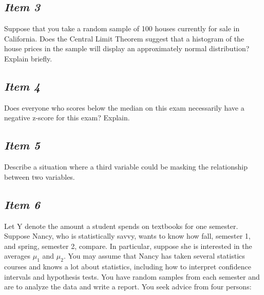 \subsection{\textbf{\textit{Item 3}}}
Suppose that you take a random sample of 100 houses currently for sale in California.  Does the Central Limit Theorem suggest that a histogram of the house prices in the sample will display an approximately normal distribution?  Explain briefly.

\subsection{\textbf{\textit{Item 4}}}
Does everyone who scores below the median on this exam necessarily have a negative z-score for this exam?  Explain.

\subsection{\textbf{\textit{Item 5}}}
%
Describe a situation
where a third variable could be masking the relationship between two variables.

\subsection{\textbf{\textit{Item 6}}}
Let Y denote the amount a student spends on textbooks for one semester. Suppose Nancy, who is statistically savvy, wants to know how fall, semester 1, and spring, semester 2, compare.  In particular, suppose she is interested in the averages $\mu_1$ and $\mu_2$.  You may assume that Nancy has taken several statistics courses and knows a lot about statistics, including how to interpret confidence intervals and hypothesis tests.  You have random samples from each semester and are to analyze the data and write a report.  You seek advice from four persons:

